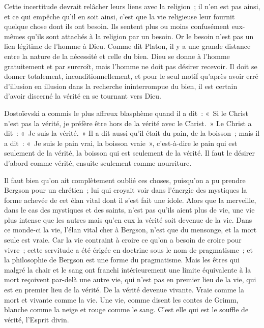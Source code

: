 \documentclass[french,twoside]{book} %
\begin{document}
Cette incertitude devrait relâcher leurs liens avec la religion ; il n'en est pas ainsi, et ce qui empêche qu'il en soit ainsi, c'est que la vie religieuse leur fournit quelque chose dont ils ont besoin. Ils sentent plus ou moins confusément eux-mêmes qu'ils sont attachés à la religion par un besoin. Or le besoin n'est pas un lien légitime de l'homme à Dieu. Comme dit Platon, il y a une grande distance entre la nature de la nécessité et celle du bien. Dieu se donne à l'homme gratuitement et par surcroît, mais l'homme ne doit pas désirer recevoir. Il doit se donner totalement, inconditionnellement, et pour le seul motif qu'après avoir erré d'illusion en illusion dans la recherche ininterrompue du bien, il est certain d'avoir discerné la vérité en se tournant vers Dieu.\par
Dostoïevski a commis le plus affreux blasphème quand il a dit : « Si le Christ n'est pas la vérité, je préfère être hors de la vérité avec le Christ. » Le Christ a dit : « Je suis la vérité. » Il a dit aussi qu'il était du pain, de la boisson ; mais il a dit : « Je suis le pain vrai, la boisson vraie », c'est-à-dire le pain qui est seulement de la vérité, la boisson qui est seulement de la vérité. Il faut le désirer d'abord comme vérité, ensuite seulement comme nourriture.\par
Il faut bien qu'on ait complètement oublié ces choses, puisqu'on a pu prendre Bergson pour un chrétien ; lui qui croyait voir dans l'énergie des mystiques la forme achevée de cet élan vital dont il s'est fait une idole. Alors que la merveille, dans le cas des mystiques et des saints, n'est pas qu'ils aient plus de vie, une vie plus intense que les autres mais qu'en eux la vérité soit devenue de la vie. Dans ce monde-ci la vie, l'élan vital cher à Bergson, n'est que du mensonge, et la mort seule est vraie. Car la vie contraint à croire ce qu'on a besoin de croire pour vivre ; cette servitude a été érigée en doctrine sous le nom de pragmatisme ; et la philosophie de Bergson est une forme du pragmatisme. Mais les êtres qui malgré la chair et le sang ont franchi intérieurement une limite équivalente à la mort reçoivent par-delà une autre vie, qui n'est pas en premier lieu de la vie, qui est en premier lieu de la vérité. De la vérité devenue vivante. Vraie comme la mort et vivante comme la vie. Une vie, comme disent les contes de Grimm, blanche comme la neige et rouge comme le sang. C'est elle qui est le souffle de vérité, l'Esprit divin.\par
\end{document}

